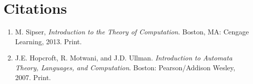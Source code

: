 \documentclass[12pt]{article}  %
\begin{document}
\section{Citations}

\begin{enumerate}
\item M. Sipser, \emph{Introduction to the Theory of Computation}. Boston, MA: Cengage Learning, 2013. Print.

\item J.E. Hopcroft, R. Motwani, and J.D. Ullman. \emph{Introduction to Automata Theory, Languages, and Computation}. Boston: Pearson/Addison Wesley, 2007. Print.
\end{enumerate}
\end{document}
